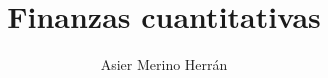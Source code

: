 
\newcommand{\NombreAutor}{Asier Merino Herrán}
\newcommand{\Titulo}{Finanzas cuantitativas}


\title{\Titulo}
\author{\NombreAutor}


